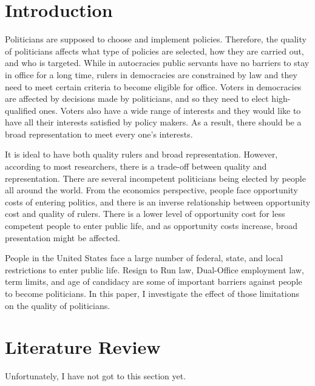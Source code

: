 \documentclass{article}
\begin{document}
\newpage
\section*{Introduction}

Politicians are supposed to choose and implement policies. Therefore, the quality of politicians affects what type of policies are selected, how they are carried out, and who is targeted. While in autocracies public servants have no barriers to stay in office for a long time, rulers in democracies are constrained by law and they need to meet certain criteria to become eligible for office. Voters in democracies are affected by decisions made by politicians, and so they need to elect high-qualified ones. Voters also have a wide range of interests and they would like to have all their interests satisfied by policy makers. As a result, there should be a broad representation to meet every one’s interests.

It is ideal to have both quality rulers and broad representation. However, according to most researchers, there is a trade-off between quality and representation. There are several incompetent politicians being elected by people all around the world. From the economics perspective, people face opportunity costs of entering politics, and there is an inverse relationship between opportunity cost and quality of rulers. There is a lower level of opportunity cost for less competent people to enter public life, and as opportunity costs increase, broad presentation might be affected.

People in the United States face a large number of federal, state, and local restrictions to enter public life. Resign to Run law, Dual-Office employment law, term limits, and age of candidacy are some of important barriers against people to become politicians. In this paper, I investigate the effect of those limitations on the quality of politicians. 


\section*{Literature Review}
 
Unfortunately, I have not got to this section yet.
\end{document}
